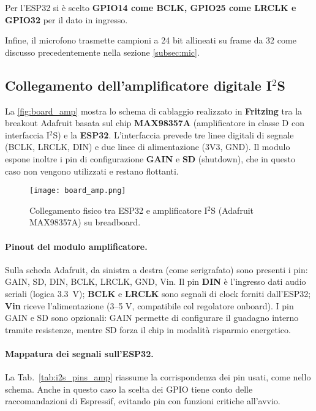  Per l’ESP32 si è scelto \textbf{GPIO14 come BCLK, GPIO25 come LRCLK e GPIO32} per il dato in ingresso.
    
  Infine, il microfono trasmette campioni a 24 bit allineati su frame da 32 come discusso precedentemente nella sezione \ref{subsec:mic}.
  
 
\subsection{Collegamento dell’amplificatore digitale I$^2$S}
\label{subsec:conn_amp}

La \autoref{fig:board_amp} mostra lo schema di cablaggio realizzato in \textbf{Fritzing} tra la breakout Adafruit basata sul chip \textbf{MAX98357A}
 (amplificatore in classe D con interfaccia I$^2$S) e la \textbf{ESP32}.  
L’interfaccia prevede tre linee digitali di segnale
(BCLK, LRCLK, DIN) e due linee di alimentazione (3V3, GND). Il modulo espone inoltre i pin di configurazione \textbf{GAIN} e \textbf{SD} (shutdown), 
che in questo caso non vengono utilizzati e restano flottanti.

\begin{figure}[H]
  \centering
  \texttt{[image: board\_amp.png]}
  \caption{Collegamento fisico tra ESP32 e amplificatore I$^2$S (Adafruit MAX98357A) su breadboard.}
  \label{fig:board_amp}
\end{figure} 

\paragraph{Pinout del modulo amplificatore.}
Sulla scheda Adafruit, da sinistra a destra (come serigrafato) sono presenti i pin: GAIN, SD, DIN, BCLK, LRCLK, GND, Vin.  
Il pin \textbf{DIN} è l’ingresso dati audio seriali (logica \SI{3.3}{\volt}); \textbf{BCLK} e \textbf{LRCLK} sono segnali di clock forniti dall’ESP32; \textbf{Vin} riceve l’alimentazione (3–5 V, compatibile col regolatore onboard).  
I pin GAIN e SD sono opzionali: GAIN permette di configurare il guadagno interno tramite resistenze, mentre SD forza il chip in modalità risparmio energetico.

\paragraph{Mappatura dei segnali sull'ESP32.}
La Tab.~\ref{tab:i2s_pins_amp} riassume la corrispondenza dei pin usati, come nello schema. Anche in questo caso la scelta dei GPIO tiene conto delle raccomandazioni di Espressif, evitando pin con funzioni critiche all’avvio.


